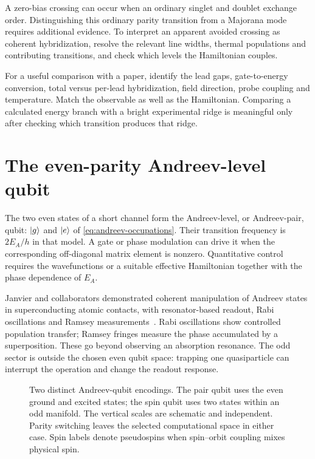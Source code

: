 A zero-bias crossing can occur when an ordinary singlet and doublet exchange
order. Distinguishing this ordinary parity transition from a Majorana mode
requires additional evidence. To interpret an apparent avoided crossing as
coherent hybridization, resolve the relevant line widths, thermal populations
and contributing transitions, and check which levels the Hamiltonian couples.

For a useful comparison with a paper, identify the lead gaps, gate-to-energy
conversion, total versus per-lead hybridization, field direction, probe coupling
and temperature. Match the observable as well as the Hamiltonian. Comparing a
calculated energy branch with a bright experimental ridge is meaningful only
after checking which transition produces that ridge.

\section{The even-parity Andreev-level qubit}\label{sec:pair-qubit}

The two even states of a short channel form the Andreev-level, or Andreev-pair,
qubit: $\lvert g\rangle$ and $\lvert e\rangle$ of \cref{eq:andreev-occupations}. Their transition
frequency is $2E_A/h$ in that model. A gate or phase modulation can drive it
when the corresponding off-diagonal matrix element is nonzero. Quantitative
control requires the wavefunctions or a suitable effective Hamiltonian together
with the phase dependence of $E_A$.

Janvier and collaborators demonstrated coherent manipulation of Andreev states
in superconducting atomic contacts, with resonator-based readout, Rabi
oscillations and Ramsey measurements~\cite{janvier2015coherent}. Rabi
oscillations show controlled population transfer; Ramsey fringes measure the
phase accumulated by a superposition. These go beyond observing an absorption
resonance. The odd sector is outside the chosen even qubit space: trapping one
quasiparticle can interrupt the operation and change the readout response.

\begin{figure}[htb]
\centering{}
\caption{Two distinct Andreev-qubit encodings. The pair qubit uses the even
ground and excited states; the spin qubit uses two states within an odd
manifold. The vertical scales are schematic and independent. Parity switching
leaves the selected computational space in either case. Spin labels denote
pseudospins when spin--orbit coupling mixes physical spin.}
\label{fig:primer-qubits}
\end{figure}

